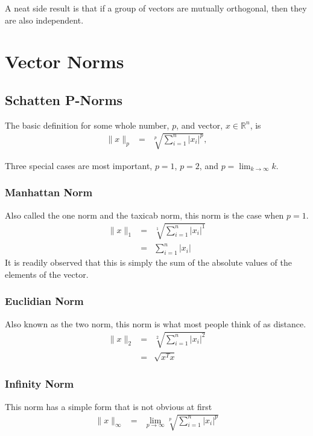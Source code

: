 A neat side result is that if a group of vectors are mutually orthogonal, then they are also independent.


\section{Vector Norms}\label{s-vect-norm}

\subsection{Schatten P-Norms}

The basic definition for some whole number, $p$, and vector, $x\in\mathbb{R}^n$, is
\begin{eqnarray}
\| x \|_p &=& \sqrt[p]{\sum_{i=1}^{n}|x_i|^p},
\end{eqnarray}

Three special cases are most important, $p=1$, $p=2$, and $p=\lim_{k\rightarrow\infty}k$.

\subsubsection{Manhattan Norm}
Also called the one norm and the taxicab norm, this norm is the case when $p=1$.
\begin{eqnarray}
\| x \|_1 &=& \sqrt[1]{\sum_{i=1}^{n}|x_i|^1}\\
&=& \sum_{i=1}^{n}|x_i|
\end{eqnarray}
It is readily observed that this is simply the sum of the absolute values of the elements of the vector.

\subsubsection{Euclidian Norm}
Also known as the two norm, this norm is what most people think of as distance.
\begin{eqnarray}
\| x \|_2 &=& \sqrt[2]{\sum_{i=1}^{n}|x_i|^2} \\
&=& \sqrt{x^Tx}
\end{eqnarray}

\subsubsection{Infinity Norm}
This norm has a simple form that is not obvious at first
\begin{eqnarray}
\| x \|_{\infty} &=& \lim_{p\rightarrow\infty}\sqrt[p]{\sum_{i=1}^{n}|x_i|^p}
\end{eqnarray}

